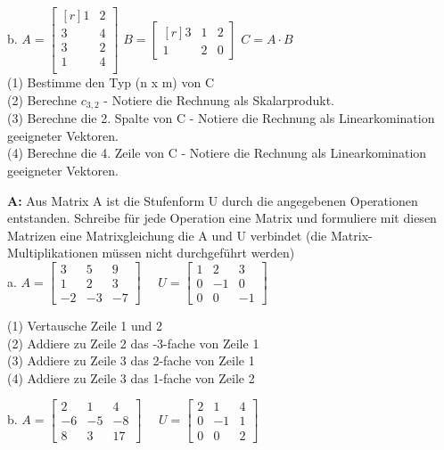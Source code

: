 \documentclass[landscape,twocolumn,a4paper]{article}
\begin{document}
 \vspace{10pt}
 
 b.
$A =\begin{bmatrix*}[r] 1 & 2\\  3 & 4 \\  3 & 2\\ 1 & 4 \\ \end{bmatrix*}$  \quad
 $B =\begin{bmatrix*}[r] 3 & 1 & 2 \\  1 & 2 &  0 \end{bmatrix*}$  \quad
 $C = A \cdot B$   \\
 (1) Bestimme den Typ (n x m) von C \\
 (2) Berechne $c_{3,2}$ - Notiere die Rechnung als Skalarprodukt.\\
 (3) Berechne die 2. Spalte von C  - Notiere die Rechnung als Linearkomination geeigneter Vektoren. \\
 (4) Berechne die 4. Zeile von C  - Notiere die Rechnung als Linearkomination geeigneter Vektoren. 

\bigskip {}

\newpage
\textbf{A:}   
Aus Matrix A ist die Stufenform U durch die angegebenen Operationen entstanden. 
Schreibe für jede Operation eine Matrix und formuliere mit diesen Matrizen eine Matrixgleichung die A und U verbindet (die Matrix-Multiplikationen müssen nicht durchgeführt werden) \\
 
a.
 $A = \left[\begin{array}{rrr}
3 & 5 & 9 \\
1 & 2 & 3 \\
-2 & -3 & -7
\end{array}\right] \quad  $  
$U = \left[\begin{array}{rrr}
1 & 2 & 3 \\
0 & -1 & 0 \\
0 & 0 & -1
\end{array}\right]  \quad$
 
 (1) Vertausche Zeile 1 und 2 \\
 (2) Addiere zu Zeile 2 das -3-fache von Zeile 1\\
 (3)  Addiere zu Zeile 3 das 2-fache von Zeile 1 \\
 (4)  Addiere zu Zeile 3 das 1-fache von Zeile 2 
 \vspace{10pt}
 
b.
 $A = \left[\begin{array}{rrr}
2 & 1 & 4 \\
-6 & -5 & -8 \\
8 & 3 & 17
\end{array}\right] \quad  $  
$U = \left[\begin{array}{rrr}
2 & 1 & 4 \\
0 & -1 & 1 \\
0 & 0 & 2
\end{array}\right]  \quad$
\end{document}
